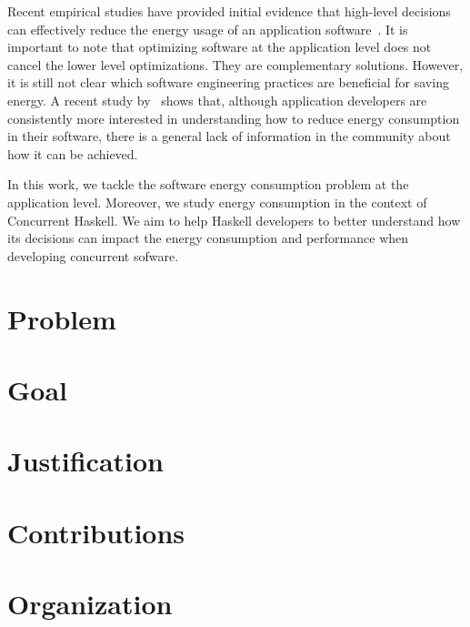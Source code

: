 Recent empirical studies have provided initial evidence that high-level decisions can effectively reduce the energy usage of an application software~\cite{chung:2001,hindle:2012,pinto:2014,trefethen:2013,manotas:2014,sahin:2014}. It is important to note that optimizing software at the application level does not cancel the lower level optimizations. They are complementary solutions. However, it is still not clear which software engineering practices are beneficial for saving energy. A recent study by~ shows that, although application developers are consistently more interested in understanding how to reduce energy consumption in their software, there is a general lack of information in the community about how it can be achieved.

In this work, we tackle the software energy consumption problem at the application level. Moreover, we study energy consumption in the context of Concurrent Haskell. We aim to help Haskell developers to better understand how its decisions can impact the energy consumption and performance when developing  concurrent sofware.


\section{Problem}
\lipsum[1-2]


\section{Goal}
\lipsum[3-4]


\section{Justification}
\lipsum[5-6]


\section{Contributions}
\lipsum[7-8]


\section{Organization}
\lipsum[9-10]

